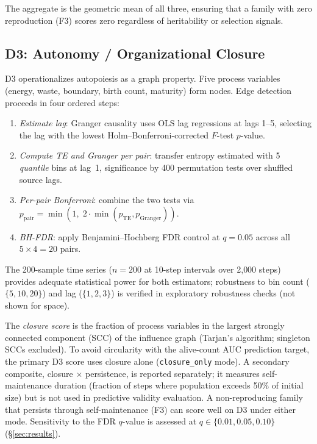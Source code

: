 \documentclass[letterpaper]{article}
\begin{document}
The aggregate is the geometric mean of all three, ensuring that a family
with zero reproduction (F3) scores zero regardless of heritability or
selection signals.

\subsection{D3: Autonomy / Organizational Closure}

D3 operationalizes autopoiesis \citep{varela_1974_autopoiesis} as a
graph property.  Five process variables (energy, waste, boundary,
birth count, maturity) form nodes.  Edge detection proceeds in four
ordered steps:
\begin{enumerate}
\item \emph{Estimate lag}: Granger causality uses OLS lag regressions
  \citep{granger_1969_causal} at lags 1--5, selecting the lag with
  the lowest Holm--Bonferroni-corrected $F$-test $p$-value.
\item \emph{Compute TE and Granger per pair}: transfer entropy estimated
  with 5 \emph{quantile} bins at lag~1, significance by 400 permutation
  tests over shuffled source lags.
\item \emph{Per-pair Bonferroni}: combine the two tests via
  $p_\text{pair} = \min(1,\; 2 \cdot \min(p_\text{TE}, p_\text{Granger}))$.
\item \emph{BH-FDR}: apply Benjamini--Hochberg FDR control at $q = 0.05$
  \citep{benjamini_1995_controlling} across all $5 \times 4 = 20$ pairs.
\end{enumerate}
The 200-sample time series ($n = 200$ at 10-step intervals over
2{,}000 steps) provides adequate statistical power for both estimators;
robustness to bin count ($\{5, 10, 20\}$) and lag ($\{1, 2, 3\}$) is
verified in exploratory robustness checks (not shown for space).

The \emph{closure score} is the fraction of process variables in the
largest strongly connected component (SCC) of the influence graph
(Tarjan's algorithm; singleton SCCs excluded).
To avoid circularity with the alive-count AUC prediction target,
the primary D3 score uses closure alone (\texttt{closure\_only} mode).
A secondary composite, closure $\times$ persistence, is reported
separately; it measures self-maintenance duration (fraction of steps
where population exceeds 50\% of initial size) but is not used in
predictive validity evaluation.
A non-reproducing family that persists through self-maintenance (F3)
can score well on D3 under either mode.
Sensitivity to the FDR $q$-value is assessed at $q \in \{0.01, 0.05, 0.10\}$
(\S\ref{sec:results}).
\end{document}

